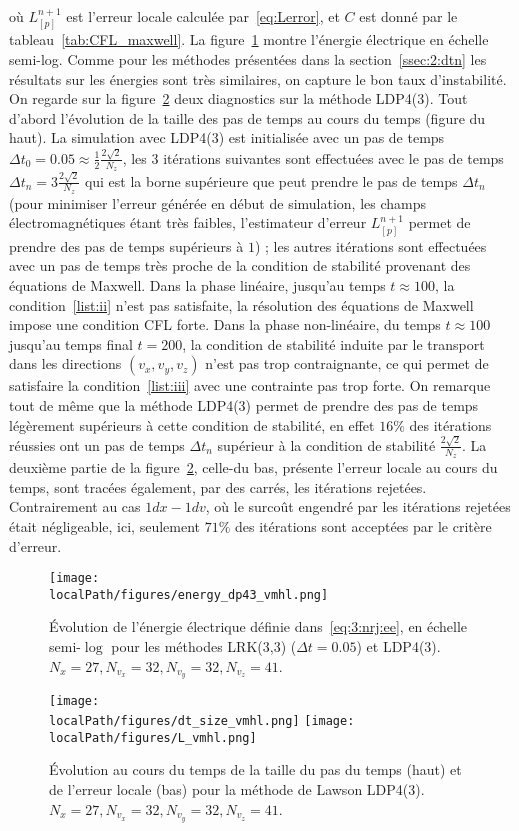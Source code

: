 où $L_{[p]}^{n+1}$ est l'erreur locale calculée par~\ref{eq:Lerror}, et $C$ est donné par le tableau~\ref{tab:CFL_maxwell}. La figure~\ref{fig:energieselecdp43} montre l'énergie électrique en échelle semi-log. Comme pour les méthodes présentées dans la section~\ref{ssec:2:dtn} les résultats sur les énergies sont très similaires, on capture le bon taux d'instabilité. On regarde sur la figure~\ref{fig:dtanderrordp43} deux diagnostics sur la méthode LDP4(3). Tout d'abord l'évolution de la taille des pas de temps au cours du temps (figure du haut). La simulation avec LDP4(3) est initialisée avec un pas de temps $\Delta t_0=0.05\approx\frac{1}{2}\frac{2\sqrt{2}}{N_z}$, les 3 itérations suivantes sont effectuées avec le pas de temps $\Delta t_n=3\frac{2\sqrt{2}}{N_z}$ qui est la borne supérieure que peut prendre le pas de temps $\Delta t_n$ (pour minimiser l'erreur générée en début de simulation, les champs électromagnétiques étant très faibles, l'estimateur d'erreur $L_{[p]}^{n+1}$ permet de prendre des pas de temps supérieurs à $1$) ; les autres itérations sont effectuées avec un pas de temps très proche de la condition de stabilité provenant des équations de Maxwell. Dans la phase linéaire, jusqu'au temps $t\approx 100$, la condition~\ref{list:ii} n'est pas satisfaite, la résolution des équations de Maxwell impose une condition CFL forte. Dans la phase non-linéaire, du temps $t\approx100$ jusqu'au temps final $t=200$, la condition de stabilité induite par le transport dans les directions $(v_x,v_y,v_z)$ n'est pas trop contraignante, ce qui permet de satisfaire la condition~\ref{list:iii} avec une contrainte pas trop forte. On remarque tout de même que la méthode LDP4(3) permet de prendre des pas de temps légèrement supérieurs à cette condition de stabilité, en effet $16\%$ des itérations réussies ont un pas de temps $\Delta t_n$ supérieur à la condition de stabilité $\frac{2\sqrt{2}}{N_z}$. La deuxième partie de la figure~\ref{fig:dtanderrordp43}, celle-du bas, présente l'erreur locale au cours du temps, sont tracées également, par des carrés, les itérations rejetées. Contrairement au cas $1dx-1dv$, où le surcoût engendré par les itérations rejetées était négligeable, ici, seulement $71\%$ des itérations sont acceptées par le critère d'erreur.

\begin{figure}[h]
  \centering
  \texttt{[image: \\localPath/figures/energy\_dp43\_vmhl.png]}
  \caption{Évolution de l'énergie électrique définie dans~\eqref{eq:3:nrj:ee}, en échelle semi-$\log$ pour les méthodes LRK(3,3) ($\Delta t = 0.05$) et LDP4(3). $N_x=27, N_{v_x}=32, N_{v_y}=32, N_{v_z}=41$.}
  \label{fig:energieselecdp43}
\end{figure}

\begin{figure}[h]
  \centering
  \texttt{[image: \\localPath/figures/dt\_size\_vmhl.png]}
  \texttt{[image: \\localPath/figures/L\_vmhl.png]}
  \caption{Évolution au cours du temps de la taille du pas du temps (haut) et de l'erreur locale (bas) pour la méthode de Lawson LDP4(3). $N_x=27, N_{v_x}=32, N_{v_y}=32, N_{v_z}=41$.}
  \label{fig:dtanderrordp43}
\end{figure}

